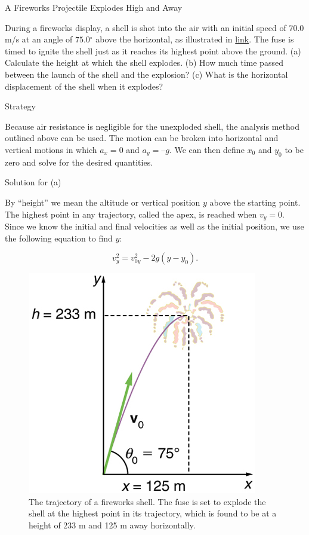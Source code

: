 \documentclass[
]{book}
\newenvironment{tinysection}{}{}
\begin{document}
\hypertarget{fs-id2175010}{}
A Fireworks Projectile Explodes High and Away

During a fireworks display, a shell is shot into the air with an initial
speed of 70.0 m/s at an angle of \(75.0{^\circ}\) above the horizontal, as
illustrated in \protect\hyperlink{import-auto-id934168}{link}.
The fuse is timed to ignite the shell just as it reaches its highest
point above the ground. (a) Calculate the height at which the shell
explodes. (b) How much time passed between the launch of the shell and
the explosion? (c) What is the horizontal displacement of the shell when
it explodes?

\begin{tinysection}

{Strategy}

\end{tinysection}

Because air resistance is negligible for the unexploded shell, the
analysis method outlined above can be used. The motion can be broken
into horizontal and vertical motions in which \({a_{x} = 0}{}\) and
\({a_{y} = –g}{}\). We can then define \(x_{0}{}\) and \(y_{0}{}\) to be zero
and solve for the desired quantities.

\begin{tinysection}

{Solution for (a)}

\end{tinysection}

By ``height'' we mean the altitude or vertical position \(y{}\) above the
starting point. The highest point in any trajectory, called the apex, is
reached when \({v_{y} = 0}{}\). Since we know the initial and final
velocities as well as the initial position, we use the following
equation to find \(y{}\):

\leavevmode\hypertarget{eip-734}{}%
\[{{v_{y}^{2} = {v_{0y}^{2} - 2g}}({y - y_{0}})\text{.}}{}\]

\begin{figure}
\hypertarget{import-auto-id934168}{%
\centering
\includegraphics{images/Figure_03_04_03a.jpg}
\caption{The trajectory of a fireworks shell. The fuse is set to explode the
shell at the highest point in its trajectory, which is found to be at a
height of 233 m and 125 m away
horizontally.}\label{import-auto-id934168}
}
\end{figure}
\end{document}
